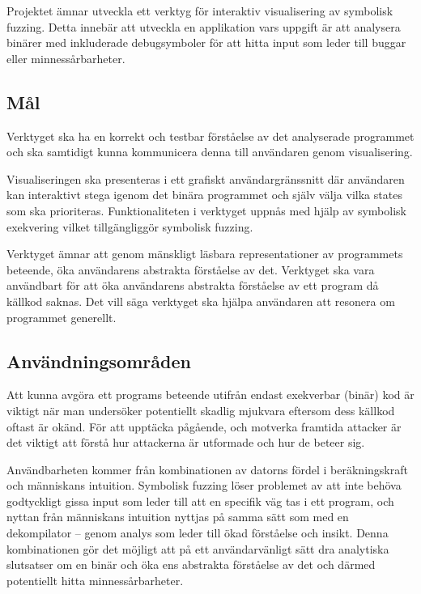 
Projektet ämnar utveckla ett verktyg för interaktiv visualisering av symbolisk
fuzzing. Detta innebär att utveckla en applikation vars uppgift är att analysera
binärer med inkluderade debugsymboler för att hitta input som leder till
buggar eller minnessårbarheter.

\subsection{Mål}
Verktyget ska ha en korrekt och testbar förståelse av det analyserade programmet
och ska samtidigt kunna kommunicera denna till användaren genom visualisering.

Visualiseringen ska presenteras i ett grafiskt användargränssnitt där användaren
kan interaktivt stega igenom det binära programmet och själv välja vilka states
som ska prioriteras. Funktionaliteten i verktyget uppnås
med hjälp av symbolisk exekvering vilket tillgängliggör symbolisk fuzzing.

Verktyget ämnar att genom mänskligt läsbara representationer av programmets 
beteende, öka användarens abstrakta förståelse av det. Verktyget ska vara 
användbart för att öka användarens abstrakta förståelse av ett program då källkod 
saknas. Det vill säga verktyget ska hjälpa användaren att resonera om programmet 
generellt. 

\subsection{Användningsområden}
Att kunna avgöra ett programs beteende utifrån endast exekverbar (binär) 
kod är viktigt när man undersöker potentiellt skadlig mjukvara eftersom
dess källkod oftast är okänd. För att upptäcka pågående, och motverka 
framtida attacker är det viktigt att förstå hur attackerna är utformade och
hur de beteer sig. 

Användbarheten kommer från kombinationen av datorns fördel i beräkningskraft
och människans intuition. Symbolisk fuzzing löser problemet av att inte behöva godtyckligt
gissa input som leder till att en specifik väg tas i ett program, och nyttan från människans
intuition nyttjas på samma sätt som med en dekompilator -- genom analys som
leder till ökad förståelse och insikt. Denna kombinationen gör det möjligt att på ett
användarvänligt sätt dra analytiska slutsatser om en binär och öka ens abstrakta
förståelse av det och därmed potentiellt hitta minnessårbarheter.
